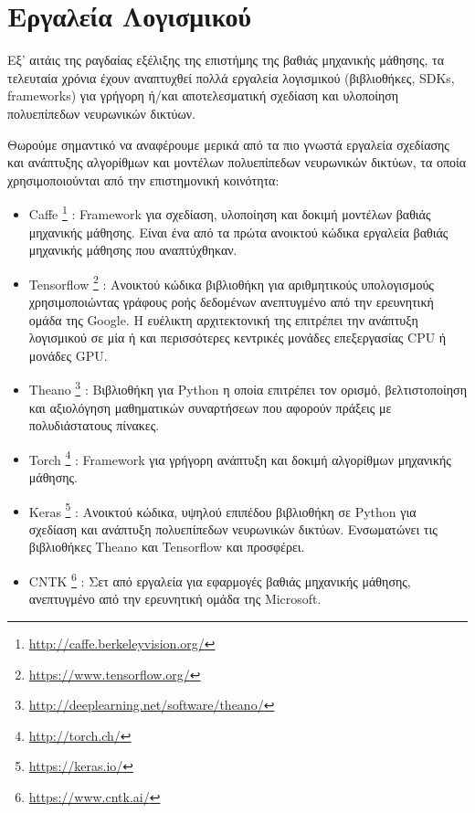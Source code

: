 \section{Εργαλεία Λογισμικού}
\label{sec:dnn_sw}

Εξ' αιτάις της ραγδαίας εξέλιξης της επιστήμης της βαθιάς μηχανικής μάθησης,
τα τελευταία χρόνια έχουν αναπτυχθεί πολλά εργαλεία λογισμικού (βιβλιοθήκες, SDKs, frameworks)
για γρήγορη ή/και αποτελεσματική σχεδίαση και υλοποίηση πολυεπίπεδων νευρωνικών δικτύων.

Θωρούμε σημαντικό να αναφέρουμε μερικά από τα πιο γνωστά εργαλεία
σχεδίασης και ανάπτυξης αλγορίθμων και μοντέλων πολυεπίπεδων νευρωνικών δικτύων, τα οποία
χρησιμοποιούνται από την επιστημονική κοινότητα:
\begin{itemize}
  \item{Caffe \footnote{\href{http://caffe.berkeleyvision.org/}{http://caffe.berkeleyvision.org/}} %
      \cite{jia2014caffe}:
    Framework για σχεδίαση, υλοποίηση και δοκιμή μοντέλων βαθιάς μηχανικής μάθησης.
    Είναι ένα από τα πρώτα ανοικτού κώδικα εργαλεία βαθιάς μηχανικής μάθησης που αναπτύχθηκαν.}
  \item{Tensorflow \footnote{\href{https://www.tensorflow.org/}{https://www.tensorflow.org/}} %
      \cite{DBLP:journals/corr/AbadiBCCDDDGIIK16}:
    Ανοικτού κώδικα βιβλιοθήκη για αριθμητικούς υπολογισμούς χρησιμοποιώντας
    γράφους ροής δεδομένων ανεπτυγμένο από την ερευνητική ομάδα της Google.
    Η ευέλικτη αρχιτεκτονική της επιτρέπει την ανάπτυξη
    λογισμικού σε μία ή και περισσότερες κεντρικές μονάδες επεξεργασίας CPU ή μονάδες GPU.}
  \item{Theano \footnote{\href{http://deeplearning.net/software/theano/}{http://deeplearning.net/software/theano/}}
      \cite{2016arXiv160502688full}\cite{bergstra+al:2010-scipy}\cite{Bastien-Theano-2012}: %
      Βιβλιοθήκη για Python η οποία επιτρέπει τον ορισμό, βελτιστοποίηση και αξιολόγηση
      μαθηματικών συναρτήσεων που αφορούν πράξεις με πολυδιάστατους πίνακες.}
    \item{Torch \footnote{\href{http://torch.ch/}{http://torch.ch/}} %
        \cite{collobert2002torch}\cite{collobert2011torch7}\cite{collobert2012implementing}:
      Framework για γρήγορη ανάπτυξη και δοκιμή αλγορίθμων μηχανικής μάθησης.}
    \item{Keras \footnote{\href{https://keras.io/}{https://keras.io/}} \cite{chollet2015keras}:
    Ανοικτού κώδικα, υψηλού επιπέδου βιβλιοθήκη σε Python για σχεδίαση και ανάπτυξη
    πολυεπίπεδων νευρωνικών δικτύων. Ενσωματώνει
    τις βιβλιοθήκες Theano και Tensorflow και προσφέρει.}
  \item{CNTK \footnote{\href{https://www.cntk.ai/}{https://www.cntk.ai/}} \cite{Seide:2016:CMO:2939672.2945397}:
    Σετ από εργαλεία για εφαρμογές βαθιάς μηχανικής μάθησης, ανεπτυγμένο από την ερευνητική ομάδα της Microsoft.}
\end{itemize}

